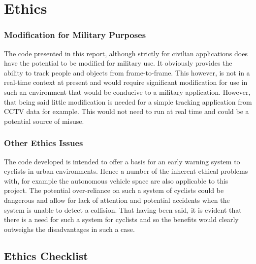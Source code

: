 \documentclass[11pt,twoside]{report}
\begin{document}
\chapter{Ethics}

\subsection{Modification for Military Purposes}
The code presented in this report, although strictly for civilian applications does have the potential to be modified for military use. It obviously provides the ability to track people and objects from frame-to-frame. This however, is not in a real-time context at present and would require significant modification for use in such an environment that would be conducive to a military application. However, that being said little modification is needed for a simple tracking application from CCTV data for example. This would not need to run at real time and could be a potential source of misuse.

\subsection{Other Ethics Issues}

The code developed is intended to offer a basis for an early warning system to cyclists in urban environments. Hence a number of the inherent ethical problems with, for example the autonomous vehicle space are also applicable to this project. The potential over-reliance on such a system of cyclists could be dangerous and allow for lack of attention and potential accidents when the system is unable to detect a collision. That having been said, it is evident that there is a need for such a system for cyclists and so the benefits would clearly outweighs the disadvantages in such a case.

\section{Ethics Checklist}


\end{document}
